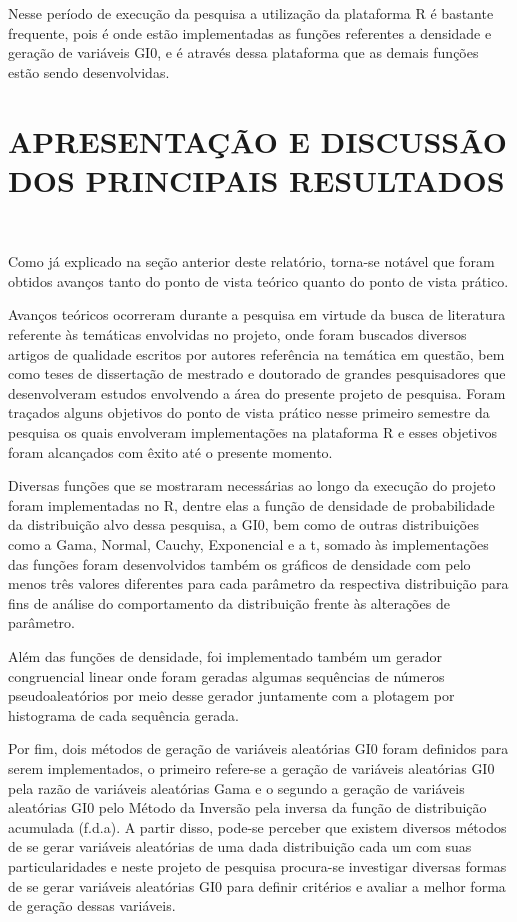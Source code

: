 \documentclass[12pt,letterpaper]{article}
\begin{document}
Nesse período de execução da pesquisa a utilização da plataforma R é bastante frequente, pois é onde estão implementadas as funções referentes a densidade e geração de variáveis GI0, e é através dessa plataforma que as demais funções estão sendo desenvolvidas. 



\newpage
\section*{\centering \textbf{APRESENTAÇÃO E DISCUSSÃO DOS PRINCIPAIS RESULTADOS}}
\hrulefill \\

\vspace{0.5cm}

Como já explicado na seção anterior deste relatório, torna-se notável que foram obtidos avanços tanto do ponto de vista teórico quanto do ponto de vista prático.

Avanços teóricos ocorreram durante a pesquisa em virtude da busca de literatura referente às temáticas envolvidas no projeto, onde foram buscados diversos artigos de qualidade escritos por autores referência na temática em questão, bem como teses de dissertação de mestrado e doutorado de grandes pesquisadores que desenvolveram estudos envolvendo a área do presente projeto de pesquisa. Foram traçados alguns objetivos do ponto de vista prático nesse primeiro semestre da pesquisa os quais envolveram implementações na plataforma R e esses objetivos foram alcançados com êxito até o presente momento.

Diversas funções que se mostraram necessárias ao longo da execução do projeto foram implementadas no R, dentre elas a função de densidade de probabilidade da distribuição alvo dessa pesquisa, a GI0, bem como de outras distribuições como a Gama, Normal, Cauchy, Exponencial e a t, somado às implementações das funções foram desenvolvidos também os gráficos de densidade com pelo menos três valores diferentes para cada parâmetro da respectiva distribuição para fins de análise do comportamento da distribuição frente às alterações de parâmetro.

Além das funções de densidade, foi implementado também um gerador congruencial linear onde foram geradas algumas sequências de números pseudoaleatórios por meio desse gerador juntamente com a plotagem por histograma de cada sequência gerada. 

Por fim, dois métodos de geração de variáveis aleatórias GI0 foram definidos para serem implementados, o primeiro refere-se a geração de variáveis aleatórias GI0 pela razão de variáveis aleatórias Gama e o segundo a geração de variáveis aleatórias GI0 pelo Método da Inversão pela inversa da função de distribuição acumulada (f.d.a). A partir disso, pode-se perceber que existem diversos métodos de se gerar variáveis aleatórias de uma dada distribuição cada um com suas particularidades e neste projeto de pesquisa procura-se investigar diversas formas de se gerar variáveis aleatórias GI0 para definir critérios e avaliar a melhor forma de geração dessas variáveis.
\end{document}
